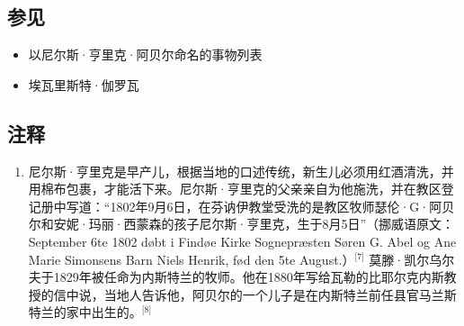 \subsection{参见}
\begin{itemize}
\item 以尼尔斯·亨里克·阿贝尔命名的事物列表
\item 埃瓦里斯特·伽罗瓦
\end{itemize}
\subsection{注释}
\begin{enumerate}
\item 尼尔斯·亨里克是早产儿，根据当地的口述传统，新生儿必须用红酒清洗，并用棉布包裹，才能活下来。尼尔斯·亨里克的父亲亲自为他施洗，并在教区登记册中写道：“1802年9月6日，在芬讷伊教堂受洗的是教区牧师瑟伦·G·阿贝尔和安妮·玛丽·西蒙森的孩子尼尔斯·亨里克，生于8月5日”（挪威语原文：September 6te 1802 døbt i Findøe Kirke Sognepræsten Søren G. Abel og Ane Marie Simonsens Barn Niels Henrik, fød den 5te August.）\(^\text{[7]}\)
莫滕·凯尔乌尔夫于1829年被任命为内斯特兰的牧师。他在1880年写给瓦勒的比耶尔克内斯教授的信中说，当地人告诉他，阿贝尔的一个儿子是在内斯特兰前任县官马兰斯特兰的家中出生的。\(^\text{[8]}\)
\end{enumerate}
